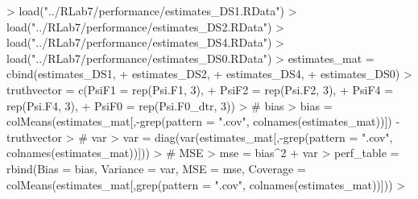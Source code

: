 \documentclass[answers]{exam}
\begin{document}
\begin{solution}
\begin{Schunk}
\begin{Sinput}
> load("../RLab7/performance/estimates_DS1.RData")
> load("../RLab7/performance/estimates_DS2.RData")
> load("../RLab7/performance/estimates_DS4.RData")
> load("../RLab7/performance/estimates_DS0.RData")
> estimates_mat = cbind(estimates_DS1,
+                       estimates_DS2,
+                       estimates_DS4,
+                       estimates_DS0)
> truthvector = c(PsiF1 = rep(Psi.F1, 3), 
+                 PsiF2 = rep(Psi.F2, 3), 
+                 PsiF4 = rep(Psi.F4, 3), 
+                 PsiF0 = rep(Psi.F0_dtr, 3))
> # bias
> bias = colMeans(estimates_mat[,-grep(pattern = ".cov", colnames(estimates_mat))]) - truthvector
> # var
> var = diag(var(estimates_mat[,-grep(pattern = ".cov", colnames(estimates_mat))]))
> # MSE
> mse = bias^2 + var
> perf_table = rbind(Bias = bias, Variance = var, MSE = mse, Coverage = colMeans(estimates_mat[,grep(pattern = ".cov", colnames(estimates_mat))]))
> 
\end{Sinput}
\end{Schunk}


\end{solution}
\end{document}
